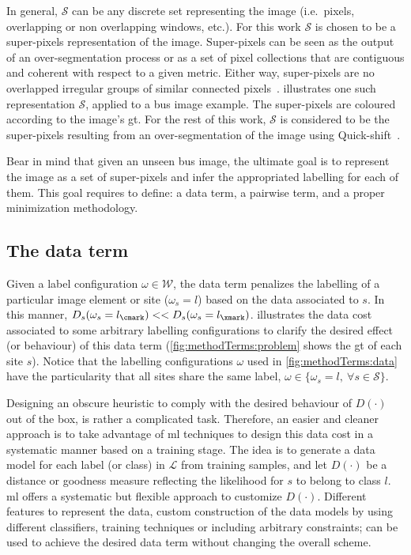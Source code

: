 In general, $\mathcal{S}$ can be any discrete set representing the image (i.e.\, pixels, overlapping or non overlapping windows, etc.). 
For this work $\mathcal{S}$ is chosen to be a super-pixels representation of the image.
Super-pixels can be seen as the output of an over-segmentation process or as a set of pixel collections that are contiguous and coherent with respect to a given metric. Either way, super-pixels are no overlapped irregular groups of similar connected pixels~\cite{achanta2012slic}.
 illustrates one such representation $\mathcal{S}$, applied to a \ac{bus} image example. The super-pixels are coloured according to the image's \ac{gt}.
For the rest of this work, $\mathcal{S}$ is considered to be the super-pixels resulting from an over-segmentation of the image using Quick-shift~\cite{massich2013phd}.

Bear in mind that given an unseen \ac{bus} image, the ultimate goal is to represent the image as a set of super-pixels and infer the appropriated labelling for each of them.
This goal requires to define: a data term, a pairwise term, and a proper minimization methodology.

\subsection{The data term} \label{sec:method:dataTerm}

Given a label configuration $\omega \in \mathcal{W}$, the data term penalizes the labelling of a particular image element or site ($\omega_s = l$) based on the data associated to $s$.
In this manner, $D_s(\omega_s=l_\cmark) << D_s(\omega_s=l_\xmark)$.
 illustrates the data cost associated to some arbitrary labelling configurations to clarify the desired effect (or behaviour) of this data term (\cref{fig:methodTerms:problem} shows the \ac{gt} of each site $s$).
Notice that the labelling configurations $\omega$ used in \cref{fig:methodTerms:data} have the particularity that all sites share the same label, $\omega \in \{ \omega_s=l,~\forall s\in\mathcal{S}\}$.

Designing an obscure heuristic to comply with the desired behaviour of $D(\cdot)$ out of the box, is rather a complicated task.
Therefore, an easier and cleaner approach is to take advantage of \ac{ml} techniques to design this data cost in a systematic manner based on a training stage. 
The idea is to generate a data model for each label (or class) in $\mathcal{L}$ from training samples, and let $D(\cdot)$ be a distance or goodness measure reflecting the likelihood for $s$ to belong to class $l$.
\ac{ml} offers a systematic but flexible approach to customize $D(\cdot)$.
Different features to represent the data, custom construction of the data models by using different classifiers, training techniques or including arbitrary constraints; can be used to achieve the desired data term without changing the overall scheme. 

